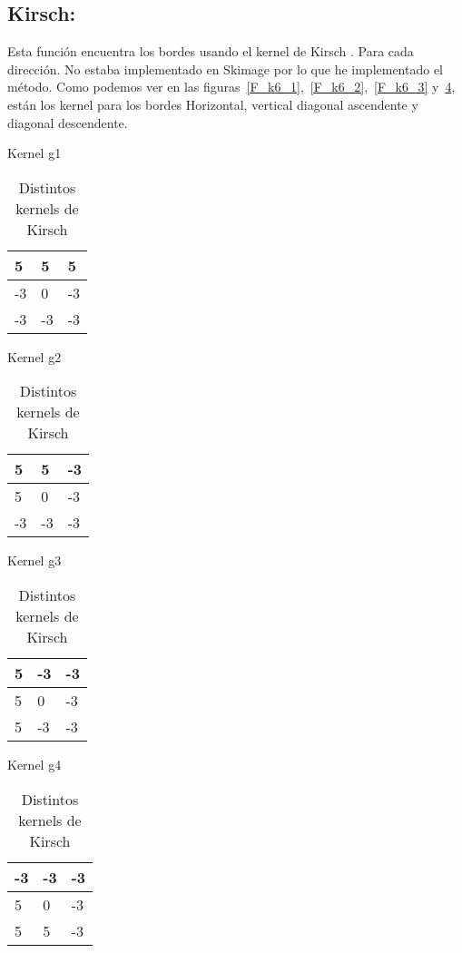 \subsection{Kirsch:}
Esta función encuentra los bordes usando el kernel de Kirsch \cite{wiki:Kirsch}. Para cada dirección.
No estaba implementado en Skimage por lo que he implementado el método.
Como podemos ver en las figuras~\ref{F_k6_1},~\ref{F_k6_2},~\ref{F_k6_3} y~\ref{F_k6_4}, están los kernel para los bordes Horizontal, vertical diagonal ascendente y diagonal descendente.
\begin{table}[!htb]

	\begin{minipage}{.5\linewidth}
		\centering
		\caption{Kernel g1}
		\label{F_k6_1}
		\begin{tabular}{|l|l|l|}
			\hline
			5  & 5  & 5  \\ \hline
			-3 & 0  & -3 \\ \hline
			-3 & -3 & -3 \\ \hline
		\end{tabular}
    \end{minipage}%
	\begin{minipage}{.5\linewidth}
		\centering
		\caption{Kernel g2}
		\label{F_k6_2}
		\begin{tabular}{|l|l|l|}
			\hline
			5  & 5  & -3  \\ \hline
			5 & 0  & -3 \\ \hline
			-3 & -3 & -3 \\ \hline
		\end{tabular}
    \end{minipage}%


	\begin{minipage}{.5\linewidth}
		\centering
		\caption{Kernel g3}
		\label{F_k6_3}
		\begin{tabular}{|l|l|l|}
			\hline
			5  & -3 & -3  \\ \hline
			5 & 0  & -3 \\ \hline
			5 & -3 & -3 \\ \hline
		\end{tabular}
    \end{minipage}%
	\begin{minipage}{.5\linewidth}
		\centering
		\caption{Kernel g4}
		\label{F_k6_4}
		\begin{tabular}{|l|l|l|}
			\hline
			-3  & -3 & -3  \\ \hline
			5 & 0  & -3 \\ \hline
			5 & 5 & -3 \\ \hline
		\end{tabular}
    \end{minipage}%
    \caption{Distintos kernels de Kirsch}
\end{table}

